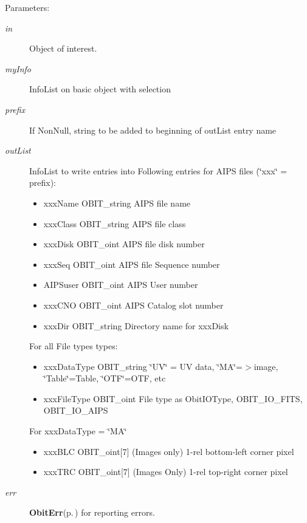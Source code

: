 \begin{Desc}
\item[Parameters:]
\begin{description}
\item[{\em in}]Object of interest. \item[{\em my\-Info}]Info\-List on basic object with selection \item[{\em prefix}]If Non\-Null, string to be added to beginning of out\-List entry name \item[{\em out\-List}]Info\-List to write entries into Following entries for AIPS files (\char`\"{}xxx\char`\"{} = prefix): \begin{itemize}
\item xxx\-Name OBIT\_\-string AIPS file name \item xxx\-Class OBIT\_\-string AIPS file class \item xxx\-Disk OBIT\_\-oint AIPS file disk number \item xxx\-Seq OBIT\_\-oint AIPS file Sequence number \item AIPSuser OBIT\_\-oint AIPS User number \item xxx\-CNO OBIT\_\-oint AIPS Catalog slot number \item xxx\-Dir OBIT\_\-string Directory name for xxx\-Disk\end{itemize}
For all File types types: \begin{itemize}
\item xxx\-Data\-Type OBIT\_\-string \char`\"{}UV\char`\"{} = UV data, \char`\"{}MA\char`\"{}=$>$image, \char`\"{}Table\char`\"{}=Table, \char`\"{}OTF\char`\"{}=OTF, etc \item xxx\-File\-Type OBIT\_\-oint File type as Obit\-IOType, OBIT\_\-IO\_\-FITS, OBIT\_\-IO\_\-AIPS\end{itemize}
For xxx\-Data\-Type = \char`\"{}MA\char`\"{} \begin{itemize}
\item xxx\-BLC OBIT\_\-oint[7] (Images only) 1-rel bottom-left corner pixel \item xxx\-TRC OBIT\_\-oint[7] (Images Only) 1-rel top-right corner pixel \end{itemize}
\item[{\em err}]{\bf Obit\-Err}{\rm (p.\,\pageref{structObitErr})} for reporting errors. \end{description}
\end{Desc}

